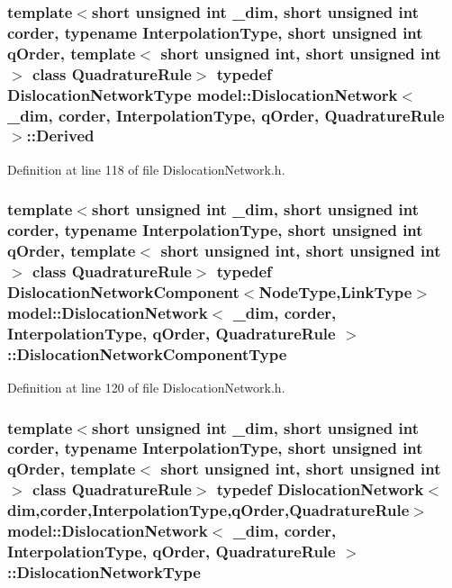 \subsubsection[{Derived}]{\setlength{\rightskip}{0pt plus 5cm}template$<$short unsigned int \+\_\+dim, short unsigned int corder, typename Interpolation\+Type, short unsigned int q\+Order, template$<$ short unsigned int, short unsigned int $>$ class Quadrature\+Rule$>$ typedef {\bf Dislocation\+Network\+Type} {\bf model\+::\+Dislocation\+Network}$<$ \+\_\+dim, corder, Interpolation\+Type, q\+Order, Quadrature\+Rule $>$\+::{\bf Derived}}\label{classmodel_1_1_dislocation_network_a9c684e15a7dbae0ab13dbfdb5c76e81c}


Definition at line 118 of file Dislocation\+Network.\+h.

\hypertarget{classmodel_1_1_dislocation_network_a9e5b5e52a5d6d20a40ee88a74cf0cc7f}{}
\subsubsection[{Dislocation\+Network\+Component\+Type}]{\setlength{\rightskip}{0pt plus 5cm}template$<$short unsigned int \+\_\+dim, short unsigned int corder, typename Interpolation\+Type, short unsigned int q\+Order, template$<$ short unsigned int, short unsigned int $>$ class Quadrature\+Rule$>$ typedef {\bf Dislocation\+Network\+Component}$<${\bf Node\+Type},{\bf Link\+Type}$>$ {\bf model\+::\+Dislocation\+Network}$<$ \+\_\+dim, corder, Interpolation\+Type, q\+Order, Quadrature\+Rule $>$\+::{\bf Dislocation\+Network\+Component\+Type}}\label{classmodel_1_1_dislocation_network_a9e5b5e52a5d6d20a40ee88a74cf0cc7f}


Definition at line 120 of file Dislocation\+Network.\+h.

\hypertarget{classmodel_1_1_dislocation_network_a0bfe40fefef57755aaa4b5071f503cff}{}
\subsubsection[{Dislocation\+Network\+Type}]{\setlength{\rightskip}{0pt plus 5cm}template$<$short unsigned int \+\_\+dim, short unsigned int corder, typename Interpolation\+Type, short unsigned int q\+Order, template$<$ short unsigned int, short unsigned int $>$ class Quadrature\+Rule$>$ typedef {\bf Dislocation\+Network}$<${\bf dim},corder,Interpolation\+Type,q\+Order,Quadrature\+Rule$>$ {\bf model\+::\+Dislocation\+Network}$<$ \+\_\+dim, corder, Interpolation\+Type, q\+Order, Quadrature\+Rule $>$\+::{\bf Dislocation\+Network\+Type}}\label{classmodel_1_1_dislocation_network_a0bfe40fefef57755aaa4b5071f503cff}



